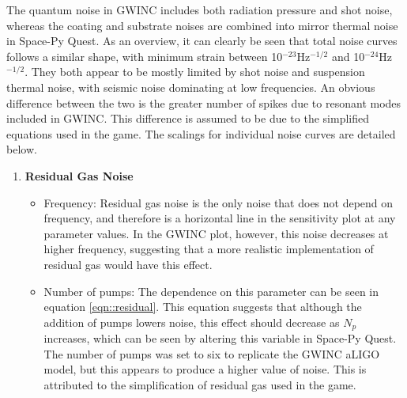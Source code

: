 \documentclass{article}
\begin{document}
The quantum noise in GWINC includes both radiation pressure and shot noise, whereas the coating and substrate noises are combined into mirror thermal noise in Space-Py Quest. As an overview, it can clearly be seen that total noise curves follows a similar shape, with minimum strain between 10$^{-23}$Hz$^{-1/2}$ and 10$^{-24}$Hz$^{-1/2}$. They both appear to be mostly limited by shot noise and suspension thermal noise, with seismic noise dominating at low frequencies. An obvious difference between the two is the greater number of spikes due to resonant modes included in GWINC. This difference is assumed to be due to the simplified equations used in the game. The scalings for individual noise curves are detailed below. 

\begin{enumerate}
    \item \textbf{Residual Gas Noise} \begin{itemize}
    \item Frequency: Residual gas noise is the only noise that does not depend on frequency, and therefore is a horizontal line in the sensitivity plot at any parameter values. In the GWINC plot, however, this noise decreases at higher frequency, suggesting that a more realistic implementation of residual gas would have this effect. 
    \item Number of pumps: The dependence on this parameter can be seen in equation \ref{eqn::residual}. This equation suggests that although the addition of pumps lowers noise, this effect should decrease as $N_p$ increases, which can be seen by altering this variable in Space-Py Quest. The number of pumps was set to six to replicate the GWINC aLIGO model, but this appears to produce a higher value of noise. This is attributed to the simplification of residual gas used in the game.  
   \end{itemize}
    

\end{enumerate}
\end{document}
